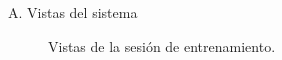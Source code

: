 \begin{annexes}{A. Vistas del sistema}
\begin{figure}[!ht]
        \caption{Vistas de la sesión de entrenamiento.}
        \label{annex: 3}
    \end{figure}


\end{annexes}
